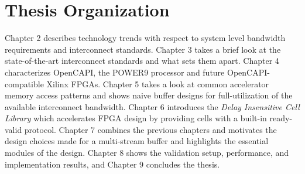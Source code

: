 \section{Thesis Organization}
Chapter 2 describes technology trends with respect to system level bandwidth requirements and interconnect standards. Chapter 3 takes a brief look at the state-of-the-art interconnect standards and what sets them apart. Chapter 4 characterizes OpenCAPI, the POWER9 processor and future OpenCAPI-compatible Xilinx FPGAs. Chapter 5 takes a look at common accelerator memory access patterns and shows naive buffer designs for full-utilization of the available interconnect bandwidth. Chapter 6 introduces the \textit{Delay Insensitive Cell Library} which accelerates FPGA design by providing cells with a built-in ready-valid protocol. Chapter 7 combines the previous chapters and motivates the design choices made for a multi-stream buffer and highlights the essential modules of the design. Chapter 8 shows the validation setup, performance, and implementation results, and Chapter 9 concludes the thesis.
